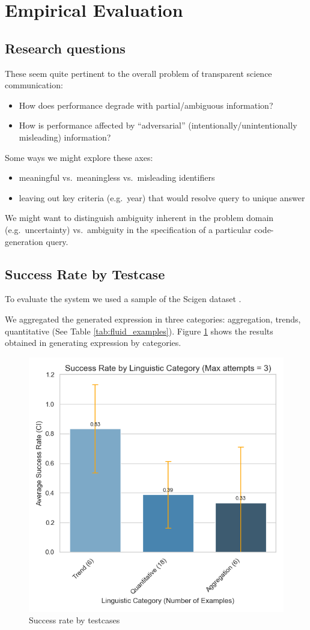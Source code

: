 \section{Empirical Evaluation}
\label{sec:evaluation}

\subsection{Research questions}

These seem quite pertinent to the overall problem of transparent science communication:
\begin{itemize}
\item How does performance degrade with partial/ambiguous information?
\item How is performance affected by ``adversarial'' (intentionally/unintentionally misleading) information?
\end{itemize}

Some ways we might explore these axes:
\begin{itemize}
\item meaningful vs.~meaningless vs.~misleading identifiers
\item leaving out key criteria (e.g.~year) that would resolve query to unique answer
\end{itemize}

We might want to distinguish ambiguity inherent in the problem domain (e.g.~uncertainty) vs.~ambiguity in the
specification of a particular code-generation query.

\subsection{Success Rate by Testcase}
To evaluate the system we used a sample of the Scigen dataset \cite{scigen_dataset_2021}.

We aggregated the generated expression in three categories: aggregation, trends, quantitative (See Table \ref{tab:fluid_examples}).
Figure \ref{fig:success_rate_by_category} shows the results obtained in generating expression by categories.

\begin{figure}[!h]
    \centering
    \includegraphics[width=0.95\linewidth]{fig/success_rate_by_category}
    \caption{Success rate by testcases}\label{fig:success_rate_by_category}
\end{figure}
